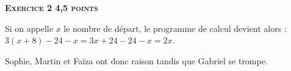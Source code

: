 \textbf{\textsc{Exercice 2 \hfill 4,5 points}}

\medskip

Si on appelle $x$ le nombre de départ, le programme de calcul devient alors :\\
$3(x+8)-24-x=3x+24-24-x=2x$.

Sophie, Martin et Faïza ont donc raison tandis que Gabriel se trompe.

\medskip

